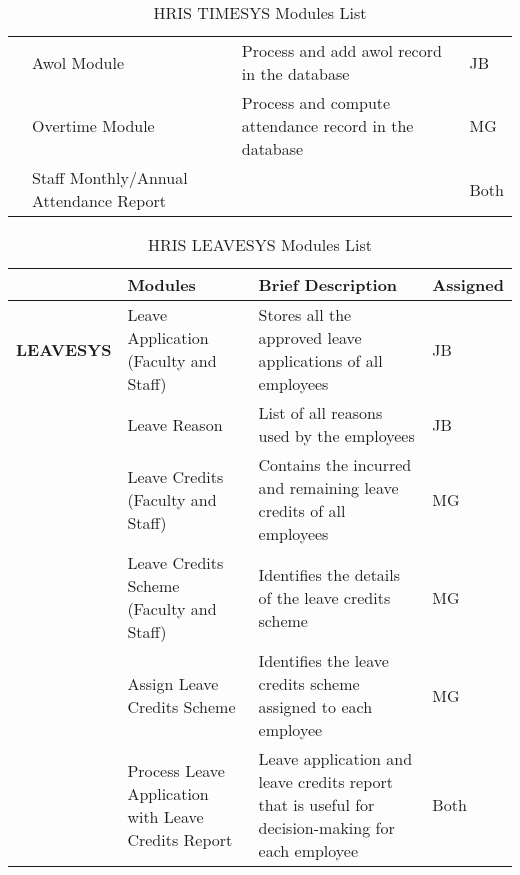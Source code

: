 \begin{table}[H]
\begin{tabularx}{\textwidth}{|p{2cm}|p{3.5cm}|X|p{1.5cm}|}
                        & Awol Module                            & Process and add awol record in the database                                                   & JB               \\
                        & Overtime Module                        & Process and compute attendance record in the database                                         & MG               \\
                        & Staff Monthly/Annual Attendance Report &                                                                                               & Both             \\ \bottomrule
    \end{tabularx}
    \caption{HRIS TIMESYS Modules List}
    \label{tab:hris-timesys-modules}
\end{table}
    
\begin{table}[H]
    \begin{tabularx}{\textwidth}{|p{2cm}|p{3.5cm}|X|p{1.5cm}|}
    \toprule
    \multicolumn{1}{|l|}{} & \textbf{Modules}                                       & \textbf{Brief Description}                                                                       & \textbf{Assigned} \\ \midrule
    \textbf{LEAVESYS}    & Leave Application (Faculty and Staff)                    & Stores all the approved leave applications of all employees                                      & JB                \\
                            & Leave Reason                                          & List of all reasons used by the employees                                                        & JB                \\
                            & Leave Credits (Faculty and Staff)                     & Contains the incurred and remaining leave credits of all employees                               & MG                \\
                            & Leave Credits Scheme (Faculty and Staff)              & Identifies the details of the leave credits scheme                                               & MG                \\
                            & Assign Leave Credits Scheme                           & Identifies the leave credits scheme assigned to each employee                                    & MG                \\
                            & Process Leave Application with Leave Credits Report   & Leave application and leave credits report that is useful for decision-making for each employee  & Both              \\ \bottomrule
\end{tabularx}
    \caption{HRIS LEAVESYS Modules List}
    \label{tab:hris-leavesys-modules}
\end{table}

